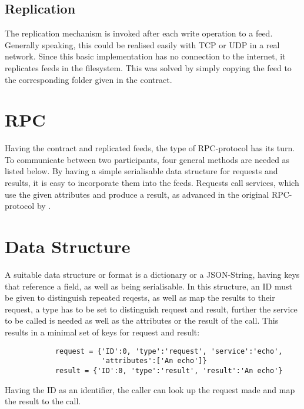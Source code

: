 \subsection{Replication}
The replication mechanism is invoked after each write operation to a feed. Generally speaking, this could be realised easily with TCP or UDP in a real network. Since this basic implementation has no connection to the internet, it replicates feeds in the filesystem. This was solved by simply copying the feed to the corresponding folder given in the contract.
\section{RPC}
Having the contract and replicated feeds, the type of RPC-protocol has its turn. To communicate between two participants, four general methods are needed as listed below. By having a simple serialisable data structure for requests and results, it is easy to incorporate them into the feeds. Requests call services, which use the given attributes and produce a result, as advanced in the original RPC-protocol by \citet{birrell1984implementing}.
\section{Data Structure}
A suitable data structure or format is a dictionary or a JSON-String, having keys that reference a field, as well as being serialisable. In this structure, an ID must be given to distinguish repeated reqests, as well as map the results to their request, a type has to be set to distinguish request and result, further the service to be called is needed as well as the attributes or the result of the call. This results in a minimal set of keys for request and result:\\


    \begin{python}
        \begin{lstlisting}
            request = {'ID':0, 'type':'request', 'service':'echo', 
                       'attributes':['An echo']}
            result = {'ID':0, 'type':'result', 'result':'An echo'}
            \end{lstlisting}
    \end{python}




Having the ID as an identifier, the caller can look up the request made and map the result to the call.
